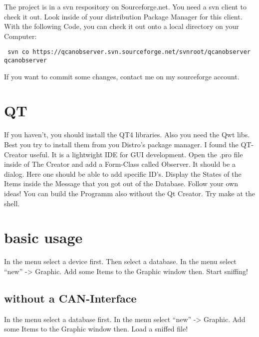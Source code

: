 \documentclass[a4paper,10pt]{article}
\begin{document}
The project is in a svn respository on Sourceforge.net.
You need a svn client to check it out. Look inside of your distribution Package Manager for this client.
With the following Code, you can check it out onto a local directory on your Computer:
\begin{verbatim}
 svn co https://qcanobserver.svn.sourceforge.net/svnroot/qcanobserver qcanobserver 
\end{verbatim} 

If you want to commit some changes, contact me on my sourceforge account. 

\section{QT}
If you haven't, you should install the QT4 libraries. Also you need the Qwt libs. Best you try to install them from you Distro's package manager.
I found the QT-Creator useful. It is a lightwight IDE for GUI development.
Open the .pro file inside of The Creator and add a Form-Class called Observer. It should be a dialog. 
Here one should be able to add specific ID's. Display the States of the Items inside the Message that you got out of the Database.
Follow your own ideas!
You can build the Programm also without the Qt Creator. Try make at the shell.

\section{basic usage}
In the menu select a device first. Then select a database. In the menu select ``new'' -> Graphic. Add some Items to the Graphic window then. Start sniffing!

\subsection{without a CAN-Interface}
In the menu select a database first. In the menu select ``new'' -> Graphic. Add some Items to the Graphic window then. Load a sniffed file!
\end{document}
